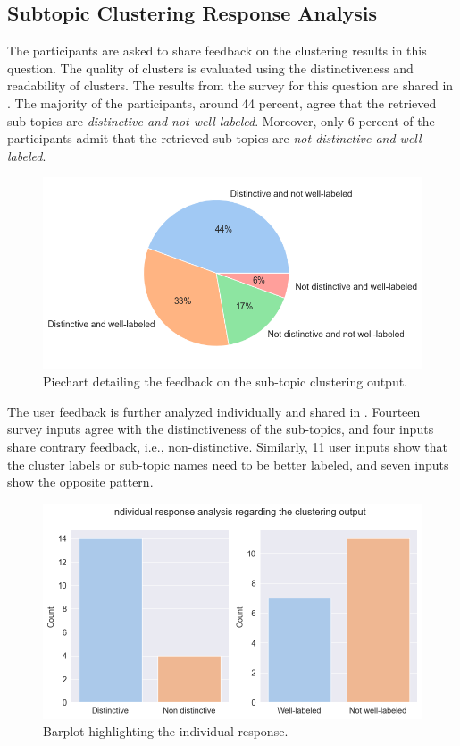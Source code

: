\subsection{Subtopic Clustering Response Analysis}

The participants are asked to share feedback on the clustering results in this question. The quality of clusters is evaluated using the distinctiveness and readability of clusters. The results from the survey for this question are shared in . The majority of the participants, around 44 percent, agree that the retrieved sub-topics are \textit{distinctive and not well-labeled}. Moreover, only 6 percent of the participants admit that the retrieved sub-topics are \textit{not distinctive and well-labeled}.

\begin{figure}[h]
	\centering
	\includegraphics[width=.8\textwidth]{images/subplots/rating_piecharts.png}
	\caption[Sub-topic clustering output feedback.]{Piechart detailing the feedback on the sub-topic clustering output. \label{fig:question_1_piechart}}
\end{figure}

The user feedback is further analyzed individually and shared in . Fourteen survey inputs agree with the distinctiveness of the sub-topics, and four inputs share contrary feedback, i.e., non-distinctive. Similarly, 11 user inputs show that the cluster labels or sub-topic names need to be better labeled, and seven inputs show the opposite pattern.

\begin{figure}[h]
	\centering
	\includegraphics[width=.9\textwidth]{images/subplots/barplots.png}
	\caption{Barplot highlighting the individual response.  \label{fig:question_1_barplot}}
\end{figure}


